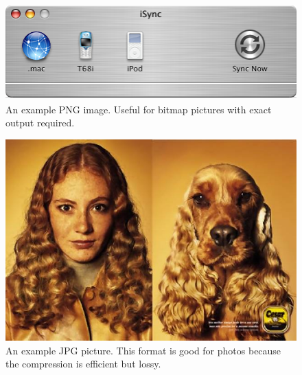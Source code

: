 \documentclass[article]{memoir}
\begin{document}

\begin{figure}[hbtp]
  \centering
  \includegraphics[height=10em]{./png-example}
  \caption{An example PNG image. Useful for bitmap pictures with exact output required.}
  \label{fig:png}
\end{figure}

\begin{figure}[htbp]
  \centering
  \includegraphics[scale=1.5]{./jpg-example}
  \caption{An example JPG picture. This format is good for photos because the compression is efficient but lossy.}
  \label{fig:jpg}
\end{figure}
\end{document}
